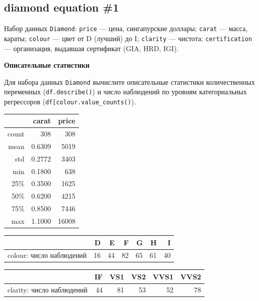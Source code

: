\documentclass[
  russian,
]{article}
\newcounter{none} %
\begin{document}
\subsection{diamond equation \#1}\label{diamond-equation-1}

Набор данных \texttt{Diamond}: \texttt{price} --- цена, сингапурские
доллары; \texttt{carat} --- масса, караты; \texttt{colour} --- цвет от D
(лучший) до I; \texttt{clarity} --- чистота; \texttt{certification} ---
организация, выдавшая сертификат (GIA, HRD, IGI).

\textbf{Описательные статистики}

Для набора данных \texttt{Diamond} вычислите описательные статистики
количественных переменных (\texttt{df.describe()}) и число наблюдений по
уровням категориальных регрессоров
(\texttt{df{[}\textquotesingle{}colour\textquotesingle{}{]}.value\_counts()}).

{\def\LTcaptype{none} %
\begin{longtable}[]{@{}rrr@{}}
\toprule\noalign{}
& carat & price \\
\midrule\noalign{}
\endhead
\bottomrule\noalign{}
\endlastfoot
count & 308 & 308 \\
mean & 0.6309 & 5019 \\
std & 0.2772 & 3403 \\
min & 0.1800 & 638 \\
25\% & 0.3500 & 1625 \\
50\% & 0.6200 & 4215 \\
75\% & 0.8500 & 7446 \\
max & 1.1000 & 16008 \\
\end{longtable}
}

{\def\LTcaptype{none} %
\begin{longtable}[]{@{}lrrrrrr@{}}
\toprule\noalign{}
& D & E & F & G & H & I \\
\midrule\noalign{}
\endhead
\bottomrule\noalign{}
\endlastfoot
colour: число наблюдений & 16 & 44 & 82 & 65 & 61 & 40 \\
\end{longtable}
}

{\def\LTcaptype{none} %
\begin{longtable}[]{@{}lrrrrr@{}}
\toprule\noalign{}
& IF & VS1 & VS2 & VVS1 & VVS2 \\
\midrule\noalign{}
\endhead
\bottomrule\noalign{}
\endlastfoot
clarity: число наблюдений & 44 & 81 & 53 & 52 & 78 \\
\end{longtable}
}
\end{document}
